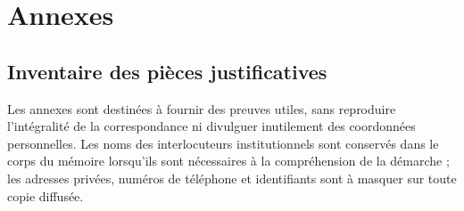 \chapter{Annexes}

\section{Inventaire des pièces justificatives}
Les annexes sont destinées à fournir des preuves utiles, sans reproduire l'intégralité de la correspondance ni divulguer inutilement des coordonnées personnelles. Les noms des interlocuteurs institutionnels sont conservés dans le corps du mémoire lorsqu'ils sont nécessaires à la compréhension de la démarche ; les adresses privées, numéros de téléphone et identifiants sont à masquer sur toute copie diffusée.

